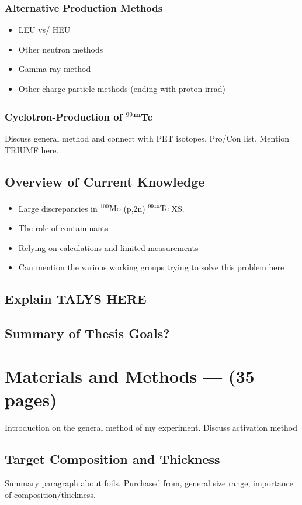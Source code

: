 \documentclass[final,3p,times,twocolumn,authoryear]{elsarticle_modified}
\newcommand{\tc}{ {\normalfont $^{99}$\textsuperscript{m}Tc} }
\newcommand{\nuc}[2]{{\normalfont $^{#1}$#2} }
\begin{document}
		\subsubsection{Alternative Production Methods}
		\begin{itemize}
			\itemsep-0.2em 
			\item LEU vs/ HEU
			\item Other neutron methods
			\item Gamma-ray method
			\item Other charge-particle methods (ending with proton-irrad)
		\end{itemize}
		\subsubsection{Cyclotron-Production of \tc}
		Discuss general method and connect with PET isotopes. Pro/Con list. Mention TRIUMF here.
	\subsection{Overview of Current Knowledge}
	\begin{itemize}
		\itemsep-0.2em 
		\item Large discrepancies in \nuc{100}{Mo}(p,2n)\tc XS.
		\item The role of contaminants
		\item Relying on calculations and limited measurements
		\item Can mention the various working groups trying to solve this problem here
	\end{itemize}	
	\subsection{Explain TALYS HERE}

	\subsection{Summary of Thesis Goals?}

\section{Materials and Methods --- (35 pages)}
\label{Methods}
Introduction on the general method of my experiment. Discuss activation method %


\subsection{Target Composition and Thickness}
\label{ICP-MS}
Summary paragraph about foils. Purchased from, general size range, importance of composition/thickness.
\end{document}
